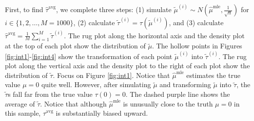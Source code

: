 \documentclass[11pt]{article}
\begin{document}
First, to find $\hat{\tau}^\text{avg}$, we complete three steps: (1) simulate $\tilde{\mu}^{(i)} \sim N \left( \hat{\mu}^\text{mle}, \frac{1}{\sqrt{n}} \right)$ for $i \in \{1, 2,\ldots, M = 1000\}$, (2) calculate $\tilde{\tau}^{(i)} = \tau\left( \tilde{\mu}^{(i)} \right)$, and (3) calculate $\hat{\tau}^\text{avg} = \frac{1}{M} \sum_{i = 1}^M \tilde{\tau}^{(i)}$. The rug plot along the horizontal axis and the density plot at the top of each plot show the distribution of $\tilde{\mu}$. The hollow points in Figures \ref{fig:int1}-\ref{fig:int4} show the transformation of each point $\tilde{\mu}^{(i)}$ into $\tilde{\tau}^{(i)}$. The rug plot along the vertical axis and the density plot to the right of each plot show the distribution of $\tilde{\tau}$. Focus on Figure \ref{fig:int1}. Notice that $\hat{\mu}^\text{mle}$ estimates the true value $\mu = 0$ quite well. However, after simulating $\tilde{\mu}$ and transforming $\tilde{\mu}$ into $\tilde{\tau}$, the $\tilde{\tau}$s fall far from the true value $\tau(0) = 0$. The dashed purple line shows the average of $\tilde{\tau}$. Notice that although $\hat{\mu}^\text{mle}$ is unusually close to the truth $\mu = 0$ in this sample, $\hat{\tau}^\text{avg}$ is substantially biased upward.
\end{document}
